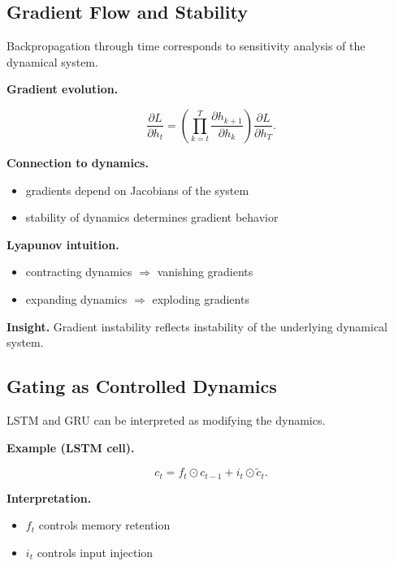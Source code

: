 \subsection{Gradient Flow and Stability}

Backpropagation through time corresponds to sensitivity analysis of the dynamical system.

\medskip

\noindent
\textbf{Gradient evolution.}

\[
\frac{\partial L}{\partial h_t}
= \left( \prod_{k=t}^{T} \frac{\partial h_{k+1}}{\partial h_k} \right)
\frac{\partial L}{\partial h_T}.
\]

\medskip

\noindent
\textbf{Connection to dynamics.}

\begin{itemize}
    \item gradients depend on Jacobians of the system
    \item stability of dynamics determines gradient behavior
\end{itemize}

\medskip

\noindent
\textbf{Lyapunov intuition.}

\begin{itemize}
    \item contracting dynamics $\Rightarrow$ vanishing gradients
    \item expanding dynamics $\Rightarrow$ exploding gradients
\end{itemize}

\medskip

\noindent
\textbf{Insight.}  
Gradient instability reflects instability of the underlying dynamical system.

\subsection{Gating as Controlled Dynamics}

LSTM and GRU can be interpreted as modifying the dynamics.

\medskip

\noindent
\textbf{Example (LSTM cell).}

\[
c_t = f_t \odot c_{t-1} + i_t \odot \tilde{c}_t.
\]

\medskip

\noindent
\textbf{Interpretation.}

\begin{itemize}
    \item $f_t$ controls memory retention
    \item $i_t$ controls input injection
\end{itemize}

